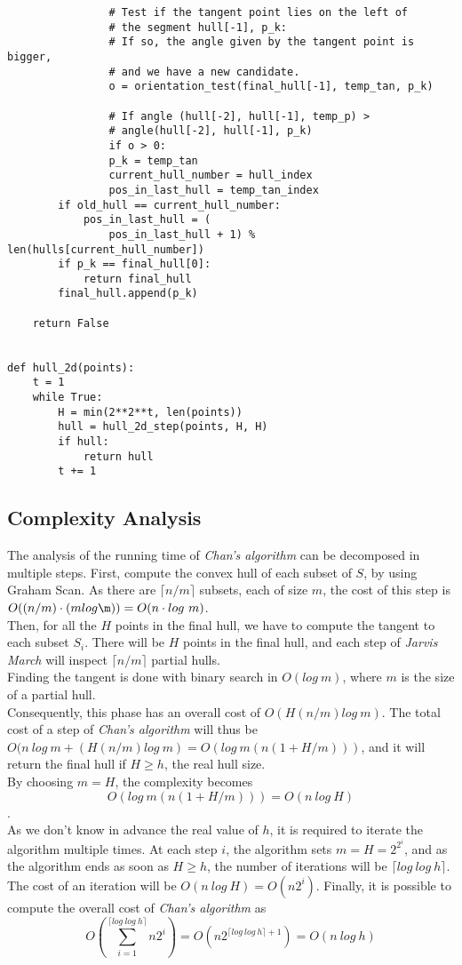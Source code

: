 \documentclass[
12pt,
a4paper,
oneside,
headinclude,
footinclude]{report}
\theoremstyle{definition} %
\begin{document}
\begin{verbatim}
				# Test if the tangent point lies on the left of 
				# the segment hull[-1], p_k:
				# If so, the angle given by the tangent point is bigger,
				# and we have a new candidate.
				o = orientation_test(final_hull[-1], temp_tan, p_k)
				
				# If angle (hull[-2], hull[-1], temp_p) > 
				# angle(hull[-2], hull[-1], p_k)
				if o > 0:
				p_k = temp_tan
				current_hull_number = hull_index
				pos_in_last_hull = temp_tan_index
		if old_hull == current_hull_number:
			pos_in_last_hull = (
				pos_in_last_hull + 1) % len(hulls[current_hull_number])
		if p_k == final_hull[0]:
			return final_hull
		final_hull.append(p_k)
	
	return False


def hull_2d(points):
	t = 1
	while True:
		H = min(2**2**t, len(points))
		hull = hull_2d_step(points, H, H)
		if hull:
			return hull
		t += 1
\end{verbatim}

\subsection{Complexity Analysis}
The analysis of the running time of \textit{Chan's algorithm} can be decomposed in multiple steps.
First, compute the convex hull of each subset of $S$, by using Graham Scan. As there are $\lceil n/m \rceil$ subsets, each of size $m$, the cost of this step is 
$O((n/m) \cdot (mlog \m)) = O(n \cdot log\ m)$.\\
Then, for all the $H$ points in the final hull, we have to compute the tangent to each subset $S_i$. There will be $H$ points in the final hull, and each step of \textit{Jarvis March} will inspect $\lceil n/m \rceil$ partial hulls.\\
Finding the tangent is done with binary search in $O(log\ m)$, where $m$ is the size of a partial hull.\\
Consequently, this phase has an overall cost of $O(H(n/m)log\ m)$.
The total cost of a step of \textit{Chan's algorithm} will thus be $O(n\ log\ m + (H(n/m)log\ m) = O(log\ m(n(1 + H/m)))$, and it will return the final hull if $H \geq h$, the real hull size.\\
By choosing $m = H$, the complexity becomes 
$$ O(log\ m(n(1 + H/m))) = O(n\ log\ H)$$.\\
As we don't know in advance the real value of $h$, it is required to iterate the algorithm multiple times. At each step $i$, the algorithm sets $m = H = 2^{2^i}$, and as the algorithm ends as soon as $H \geq h$, the number of iterations will be $\lceil log\ log\ h\rceil$.\\
The cost of an iteration will be $O(n\ log\ H) = O(n2^i)$.
Finally, it is possible to compute the overall cost of \textit{Chan's algorithm} as
$$O\left(\sum_{i = 1}^{\lceil log\ log\ h\rceil}{n2^i}\right) = O(n2^{\lceil log\ log\ h\rceil + 1}) = O(n\ log\ h)$$
\end{document}
